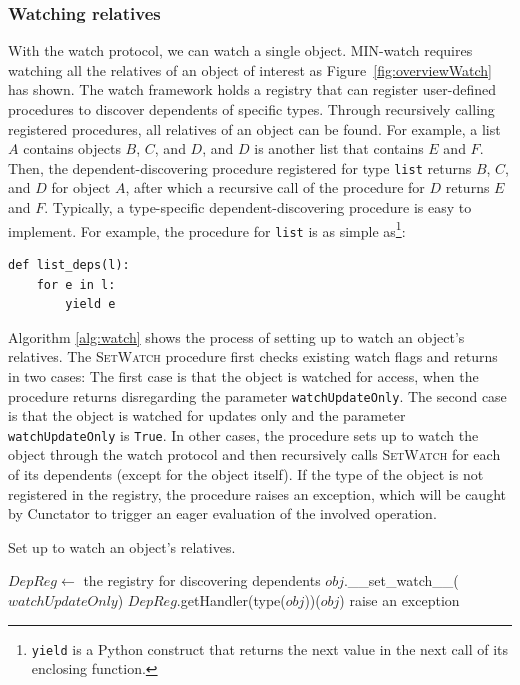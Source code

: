 \documentclass[sigconf]{acmart}\settopmatter{printfolios=true,printccs=false,printacmref=false}\setcopyright{none}
\begin{document}
\subsubsection{Watching relatives}
\label{sec:watchdeps}

With the watch protocol, we can watch a single object. MIN-watch requires watching all the relatives of an object of interest as Figure~\ref{fig:overviewWatch} has shown. The watch framework holds a registry that can register user-defined procedures to discover dependents of specific types. Through recursively calling registered procedures, all relatives of an object can be found. For example, a list $A$ contains objects $B$, $C$, and $D$, and $D$ is another list that contains $E$ and $F$. Then, the dependent-discovering procedure registered for type \texttt{list} returns $B$, $C$, and $D$ for object $A$, after which a recursive call of the procedure for $D$ returns $E$ and $F$. Typically, a type-specific dependent-discovering procedure is easy to implement. For example, the procedure for \texttt{list} is as simple as\footnote{\texttt{yield} is a Python construct that returns the next value in the next call of its enclosing function.}:

\begin{lstlisting}[style=myPythonStyle]
def list_deps(l):
    for e in l:
        yield e
\end{lstlisting}

Algorithm \ref{alg:watch} shows the process of setting up to watch an object's relatives. The \textsc{SetWatch} procedure first checks existing watch flags and returns in two cases: The first case is that the object is watched for access, when the procedure returns disregarding the parameter \texttt{watchUpdateOnly}. The second case is that the object is watched for updates only and the parameter \texttt{watchUpdateOnly} is \texttt{True}. In other cases, the procedure sets up to watch the object through the watch protocol and then recursively calls \textsc{SetWatch} for each of its dependents (except for the object itself). If the type of the object is not registered in the registry, the procedure raises an exception, which will be caught by Cunctator to trigger an eager evaluation of the involved operation.

\begin{algorithm}
\caption{Set up to watch an object's relatives.}
\label{alg:watch}
\begin{algorithmic}[1]
\State $DepReg \leftarrow $ the registry for discovering dependents
     \Return \EndIf
     \Return \EndIf
    \State $obj$.\_\_set\_watch\_\_($watchUpdateOnly$)
        \State {}
    \EndFor
\EndProcedure
{}
\State \Return $DepReg$.getHandler(type($obj$))($obj$)
\Else
\State raise an exception
\EndIf
\EndProcedure
\end{algorithmic}
\end{algorithm}
\end{document}
